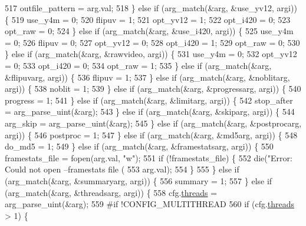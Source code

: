 \begin{DoxyCodeInclude}
{{{{{{{{{{{{{{{{{{{{{{{{{{517       outfile\_pattern = arg.val;
518     \} \textcolor{keywordflow}{else} \textcolor{keywordflow}{if} (arg\_match(&arg, &use\_yv12, argi)) \{
519       use\_y4m = 0;
520       flipuv = 1;
521       opt\_yv12 = 1;
522       opt\_i420 = 0;
523       opt\_raw = 0;
524     \} \textcolor{keywordflow}{else} \textcolor{keywordflow}{if} (arg\_match(&arg, &use\_i420, argi)) \{
525       use\_y4m = 0;
526       flipuv = 0;
527       opt\_yv12 = 0;
528       opt\_i420 = 1;
529       opt\_raw = 0;
530     \} \textcolor{keywordflow}{else} \textcolor{keywordflow}{if} (arg\_match(&arg, &rawvideo, argi)) \{
531       use\_y4m = 0;
532       opt\_yv12 = 0;
533       opt\_i420 = 0;
534       opt\_raw = 1;
535     \} \textcolor{keywordflow}{else} \textcolor{keywordflow}{if} (arg\_match(&arg, &flipuvarg, argi)) \{
536       flipuv = 1;
537     \} \textcolor{keywordflow}{else} \textcolor{keywordflow}{if} (arg\_match(&arg, &noblitarg, argi)) \{
538       noblit = 1;
539     \} \textcolor{keywordflow}{else} \textcolor{keywordflow}{if} (arg\_match(&arg, &progressarg, argi)) \{
540       progress = 1;
541     \} \textcolor{keywordflow}{else} \textcolor{keywordflow}{if} (arg\_match(&arg, &limitarg, argi)) \{
542       stop\_after = arg\_parse\_uint(&arg);
543     \} \textcolor{keywordflow}{else} \textcolor{keywordflow}{if} (arg\_match(&arg, &skiparg, argi)) \{
544       arg\_skip = arg\_parse\_uint(&arg);
545     \} \textcolor{keywordflow}{else} \textcolor{keywordflow}{if} (arg\_match(&arg, &postprocarg, argi)) \{
546       postproc = 1;
547     \} \textcolor{keywordflow}{else} \textcolor{keywordflow}{if} (arg\_match(&arg, &md5arg, argi)) \{
548       do\_md5 = 1;
549     \} \textcolor{keywordflow}{else} \textcolor{keywordflow}{if} (arg\_match(&arg, &framestatsarg, argi)) \{
550       framestats\_file = fopen(arg.val, \textcolor{stringliteral}{"w"});
551       \textcolor{keywordflow}{if} (!framestats\_file) \{
552         die(\textcolor{stringliteral}{"Error: Could not open --framestats file (%
553             arg.val);
554       \}
555     \} \textcolor{keywordflow}{else} \textcolor{keywordflow}{if} (arg\_match(&arg, &summaryarg, argi)) \{
556       summary = 1;
557     \} \textcolor{keywordflow}{else} \textcolor{keywordflow}{if} (arg\_match(&arg, &threadsarg, argi)) \{
558       cfg.\hyperlink{structaom__codec__dec__cfg_a48c68337e1071e2aee36c649e579f189}{threads} = arg\_parse\_uint(&arg);
559 \textcolor{preprocessor}{#if !CONFIG\_MULTITHREAD}
560       \textcolor{keywordflow}{if} (cfg.\hyperlink{structaom__codec__dec__cfg_a48c68337e1071e2aee36c649e579f189}{threads} > 1) \{
}}}}}}}}}}}}}}}}}}}}}}}}}}}
\end{DoxyCodeInclude}
